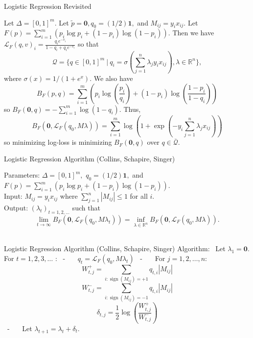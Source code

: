 \documentclass[10pt]{beamer}
\begin{document}
\begin{frame}{Logistic Regression Revisited}

Let $\Delta = [0,1]^m.$ Let $\tilde{p} = \mathbf{0}, q_0 = (1/2) \mathbf{1},$ and $M_{ij} = y_i x_{ij}.$ Let $F(p) = \sum_{i=1}^m \left( p_i \log p_i + (1-p_i) \log(1-p_i) \right).$ Then we have $ \mathcal{L}_F(q,v)_i = \frac{q_i e^{-v_i}}{1-q_i + q_i e^{-v_i}}$ so that $$\mathcal{Q} = \bigg\{ q\in [0,1]^m \ | \ q_i = \sigma\left( \sum_{j=1}^n \lambda_j y_i x_{ij} \right), \lambda \in \mathbb{R}^n \bigg\},$$ where $\sigma(x) = 1/(1+e^x).$ We also have $$ B_F(p,q) = \sum_{i=1}^m \left( p_i \log \left( \frac{p_i}{q_i} \right) + (1-p_i) \log \left( \frac{1-p_i}{1-q_i} \right) \right)$$ so $B_F(\mathbf{0}, q) = -\sum_{i=1}^m \log(1-q_i).$ Thus, $$B_F(\mathbf{0}, \mathcal{L}_F(q_0, M\lambda)) = \sum_{i=1}^m \log\left(1+\exp\left(-y_i\sum_{j=1}^n \lambda_j x_{ij}\right) \right)$$ so minimizing log-loss is minimizing $B_F(\mathbf{0}, q)$ over $q\in \bar{\mathcal{Q}}.$ 
\end{frame}



\begin{frame}{Logistic Regression Algorithm (Collins, Schapire, Singer)}

Parameters: $\Delta = [0,1]^m,$ $q_0 = (1/2) \mathbf{1},$ and $F(p) = \sum_{i=1}^m \left( p_i \log p_i + (1-p_i) \log(1-p_i) \right).$\
\newline \\
Input: $M_{ij} = y_i x_{ij}$ where $\sum_{j=1}^n |M_{ij}| \leq 1$ for all $i.$ \
\newline \\
Output: $(\lambda_t)_{t=1,2,\ldots}$ such that $$ \lim_{t\to\infty} B_F(\mathbf{0}, \mathcal{L}_F(q_0, M\lambda_t)) = \inf_{\lambda\in\mathbb{R}^n} B_F(\mathbf{0}, \mathcal{L}_F(q_0, M\lambda)).$$ \
\newline \\
\end{frame}

\begin{frame}{Logistic Regression Algorithm (Collins, Schapire, Singer)}
 Algorithm: \ Let $\lambda_1=\mathbf{0}.$
\newline For $t=1,2,3, \ldots$ : \
\newline - \ \ \ $q_t = \mathcal{L}_F(q_0, M\lambda_t)$ \
\newline - \ \ \ For $j=1,2,\ldots, n:$ $$W^+_{t,j} = \sum_{i : \operatorname{sign}(M_{ij}) = +1 } q_{t,i} |M_{ij}|$$ $$ W^-_{t,j} = \sum_{i : \operatorname{sign}(M_{ij}) = -1 } q_{t,i} |M_{ij}|$$ $$ \delta_{t,j} = \frac{1}{2} \log \left( \frac{ W^+_{t,j}}{W^-_{t,j}} \right) $$\
\newline - \ \ \ Let $\lambda_{t+1} = \lambda_t + \delta_t.$ 
\end{frame}
\end{document}
